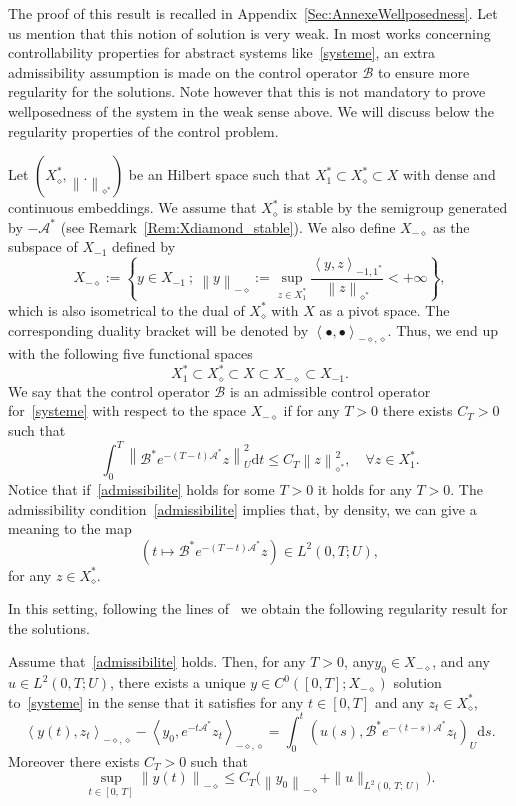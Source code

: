 \documentclass[AHL,Unicode,longabstracts]{cedram}
\newcommand\As{\mathcal{A}^*}
\newcommand\B{\mathcal{B}}
\newcommand\Bs{\mathcal{B}^*}
\newcommand{\Xuns}{X_1^*}
\newcommand{\Xmun}{X_{-1}}
\newcommand{\Xalphas}{X_\diamond^*}
\newcommand{\Xmalpha}{X_{-\diamond}}
\newcommand{\normeU}[1]{\left\| #1 \right\|_U}
\newcommand{\normeXalphas}[1]{\left\| #1 \right\|_{\diamond^*}}
\newcommand{\normeXmalpha}[1]{\left\| #1 \right\|_{-\diamond}}
\newcommand{\psU}[2]{\left(#1, #2 \right)_U}
\newcommand{\dual}[2]{\left\langle #1, #2 \right\rangle_{-\diamond,\diamond}}
\newcommand{\dualX}[2]{\left\langle #1, #2 \right\rangle_{-1,1^*}}
\newcommand{\md}{\mathrm{d}}
\renewcommand{\cdot}{{\scriptstyle \bullet}}
\let\oldforall\forall
\renewcommand*{\forall}{\mathrel{\oldforall}}
\begin{document}
The proof of this result is recalled in Appendix~\ref{Sec:AnnexeWellposedness}. Let us mention that this notion of solution is very weak. In most works concerning controllability properties for abstract systems like~\eqref{systeme}, an extra admissibility assumption is made on the control operator $\B$ to ensure more regularity for the solutions. Note however that this is not mandatory to prove wellposedness of the system in the weak sense above. We will discuss below the regularity properties of the control problem.

Let $(\Xalphas, \normeXalphas{.})$ be an Hilbert space such that $\Xuns \subset \Xalphas \subset X$ with dense and continuous embeddings. We assume that $\Xalphas$ is stable by the semigroup generated by $-\As$ (see Remark~\ref{Rem:Xdiamond_stable}). We also define $\Xmalpha$ as the subspace of $\Xmun$ defined by
\begin{equation*}\label{Def:X-alpha}
\Xmalpha := \left\{ y \in \Xmun \: ; \: \normeXmalpha{y} := \sup\limits_{z \in \Xuns} \frac{\dualX{y}{z}}{\normeXalphas{z}} < + \infty \right\},
\end{equation*}
which is also isometrical to the dual of $\Xalphas$ with $X$ as a pivot space. The corresponding duality bracket will be denoted by $\dual{\cdot}{\cdot}$. Thus, we end up with the following five functional spaces
\begin{equation*}\label{QuintupleDualite}
\Xuns \subset \Xalphas \subset X \subset \Xmalpha \subset \Xmun.
\end{equation*}
We say that the control operator $\B$ is an admissible control operator for~\eqref{systeme} with respect to the space $\Xmalpha$ if for any $T>0$ there exists $C_T >0$ such that
\begin{equation}\label{admissibilite}
\int_0^T \normeU{\Bs e^{-(T-t)\As} z}^2 \md t \leq C_T \normeXalphas{ z }^2, \quad \forall z \in \Xuns.
\end{equation}
Notice that if~\eqref{admissibilite} holds for some $T>0$ it holds for any $T>0$. The admissibility condition~\eqref{admissibilite} implies that, by density, we can give a meaning to the map
\[
\left(t \mapsto \Bs e^{-(T-t) \As} z \right) \in L^2(0,T ; U),
\]
for any $z\in \Xalphas$.

In this setting, following the lines of~\cite[Theorem~2.37]{CoronBook} we obtain the following regularity result for the solutions.

\begin{prop}\label{Prop:Wellposedness}
Assume that~\eqref{admissibilite} holds. Then, for any $T>0$, any\linebreak$y_0 \in \Xmalpha$, and any $u \in L^2(0,T ; U)$, there exists a unique $y \in C^0([0,T]; \Xmalpha)$ solution to~\eqref{systeme} in the sense that it satisfies for any $t \in [0,T]$ and any $z_t \in \Xalphas$,
\begin{equation*}\label{CaracterisationDualeSolutions}
\dual{y(t)}{z_t} - \dual{y_0}{e^{-t\As} z_t} = \int_0^t \psU{u(s)}{ \Bs e^{-(t-s) \As} z_t} \md s.
\end{equation*}
Moreover there exists $C_T>0$ such that
\[
\sup\limits_{t \in [0,\,T]} \normeXmalpha{y(t)} \leq C_T \big(\normeXmalpha{y_0} + \| u \|_{L^2(0,\,T;\,U)} \big).
\]
\end{prop}
\end{document}
